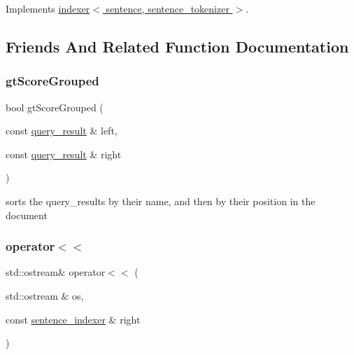 Implements \hyperlink{classindexer_a9a7679edcc3114613dac13b688c0e4b2}{indexer$<$ sentence, sentence\+\_\+tokenizer $>$}.



\subsection{Friends And Related Function Documentation}
\mbox{\label{classsentence__indexer_a105a138776c9677f92568db3f53d91f2}} 
\subsubsection{\texorpdfstring{gt\+Score\+Grouped}{gtScoreGrouped}}
{\footnotesize\ttfamily bool gt\+Score\+Grouped (\begin{DoxyParamCaption}\item[{const \hyperlink{classquery__result}{query\+\_\+result} \&}]{left,  }\item[{const \hyperlink{classquery__result}{query\+\_\+result} \&}]{right }\end{DoxyParamCaption})\hspace{0.3cm}{\ttfamily [friend]}}

sorts the query\+\_\+results by their name, and then by their position in the document \mbox{\label{classsentence__indexer_ad09f6baaa740dac6056316377c95dfa7}} 
\subsubsection{\texorpdfstring{operator$<$$<$}{operator<<}}
{\footnotesize\ttfamily std\+::ostream\& operator$<$$<$ (\begin{DoxyParamCaption}\item[{std\+::ostream \&}]{os,  }\item[{const \hyperlink{classsentence__indexer}{sentence\+\_\+indexer} \&}]{right }\end{DoxyParamCaption})\hspace{0.3cm}{\ttfamily [friend]}}

